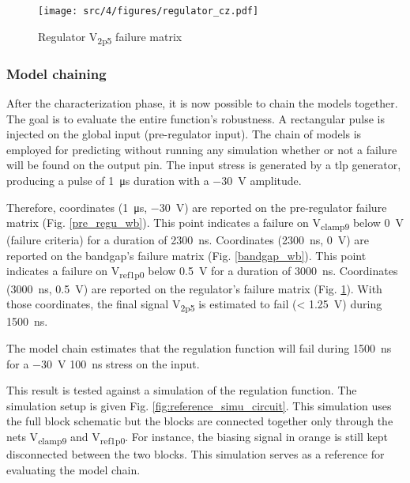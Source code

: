 \begin{figure}[!h]
  \centering
  \texttt{[image: src/4/figures/regulator\_cz.pdf]}
  \caption{Regulator V\textsubscript{2p5} failure matrix}
  \label{regu_wb}
\end{figure}

\subsubsection{Model chaining}

After the characterization phase, it is now possible to chain the models together.
The goal is to evaluate the entire function's robustness.
A rectangular pulse is injected on the global input (pre-regulator input).
The chain of models is employed for predicting without running any simulation whether or not a failure will be found on the output pin.
The input stress is generated by a \gls{tlp} generator, producing a pulse of \SI{1}{\micro\second} duration with a \SI{-30}{\volt} amplitude.

Therefore, coordinates (\SI{1}{\micro\second}, \SI{-30}{\volt}) are reported on the pre-regulator failure matrix (Fig. \ref{pre_regu_wb}).
This point indicates a failure on V\textsubscript{clamp9} below \SI{0}{\volt} (failure criteria) for a duration of \SI{2300}{\nano\second}.
Coordinates (\SI{2300}{\nano\second}, \SI{0}{\volt}) are reported on the bandgap's failure matrix (Fig. \ref{bandgap_wb}).
This point indicates a failure on V\textsubscript{ref1p0} below \SI{0.5}{\volt} for a duration of \SI{3000}{\nano\second}.
Coordinates (\SI{3000}{\nano\second}, \SI{0.5}{\volt}) are reported on the regulator's failure matrix (Fig. \ref{regu_wb}).
With those coordinates, the final signal V\textsubscript{2p5} is estimated to fail (< \SI{1.25}{\volt}) during \SI{1500}{\nano\second}.

The model chain estimates that the regulation function will fail during \SI{1500}{\nano\second} for a \SI{-30}{\volt} \SI{100}{\nano\second} stress on the input.

This result is tested against a simulation of the regulation function.
The simulation setup is given Fig. \ref{fig:reference_simu_circuit}.
This simulation uses the full block schematic but the blocks are connected together only through the nets V\textsubscript{clamp9} and V\textsubscript{ref1p0}.
For instance, the biasing signal in orange is still kept disconnected between the two blocks.
This simulation serves as a reference for evaluating the model chain.

